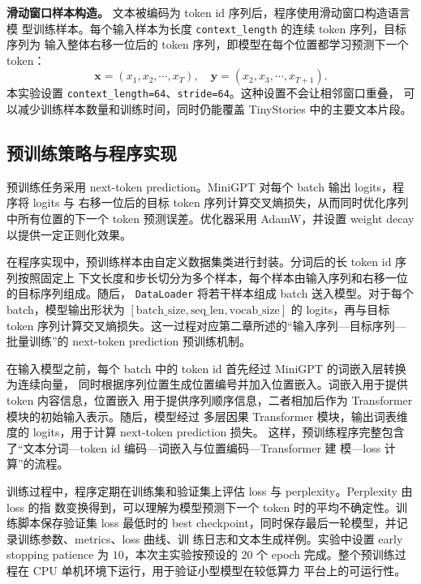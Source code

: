 \documentclass[UTF8,a4paper,zihao=-4,fontset=none]{ctexart}
\numberwithin{equation}{section}
\begin{document}
\textbf{滑动窗口样本构造。} 文本被编码为 token id 序列后，程序使用滑动窗口构造语言模
型训练样本。每个输入样本为长度 \texttt{context\_length} 的连续 token 序列，目标序列为
输入整体右移一位后的 token 序列，即模型在每个位置都学习预测下一个 token：
\begin{equation}
  \mathbf{x}=(x_1,x_2,\cdots,x_T),\quad
  \mathbf{y}=(x_2,x_3,\cdots,x_{T+1}) .
  \label{eq:pretrain_next_token_sample}
\end{equation}
本实验设置 \texttt{context\_length=64}、\texttt{stride=64}。这种设置不会让相邻窗口重叠，
可以减少训练样本数量和训练时间，同时仍能覆盖 TinyStories 中的主要文本片段。

\subsection{预训练策略与程序实现}

预训练任务采用 next-token prediction。MiniGPT 对每个 batch 输出 logits，程序将 logits 与
右移一位后的目标 token 序列计算交叉熵损失，从而同时优化序列中所有位置的下一个 token
预测误差。优化器采用 AdamW，并设置 weight decay 以提供一定正则化效果。

在程序实现中，预训练样本由自定义数据集类进行封装。分词后的长 token id 序列按照固定上
下文长度和步长切分为多个样本，每个样本由输入序列和右移一位的目标序列组成。随后，
\texttt{DataLoader} 将若干样本组成 batch 送入模型。对于每个 batch，模型输出形状为
$[\mathrm{batch\_size},\mathrm{seq\_len},\mathrm{vocab\_size}]$ 的 logits，再与目标 token
序列计算交叉熵损失。这一过程对应第二章所述的“输入序列—目标序列—批量训练”的
next-token prediction 预训练机制。

在输入模型之前，每个 batch 中的 token id 首先经过 MiniGPT 的词嵌入层转换为连续向量，
同时根据序列位置生成位置编号并加入位置嵌入。词嵌入用于提供 token 内容信息，位置嵌入
用于提供序列顺序信息，二者相加后作为 Transformer 模块的初始输入表示。随后，模型经过
多层因果 Transformer 模块，输出词表维度的 logits，用于计算 next-token prediction 损失。
这样，预训练程序完整包含了“文本分词—token id 编码—词嵌入与位置编码—Transformer 建
模—loss 计算”的流程。

训练过程中，程序定期在训练集和验证集上评估 loss 与 perplexity。Perplexity 由 loss 的指
数变换得到，可以理解为模型预测下一个 token 时的平均不确定性。训练脚本保存验证集 loss
最低时的 best checkpoint，同时保存最后一轮模型，并记录训练参数、metrics、loss 曲线、训
练日志和文本生成样例。实验中设置 early stopping patience 为 $10$，本次主实验按预设的
$20$ 个 epoch 完成。整个预训练过程在 CPU 单机环境下运行，用于验证小型模型在较低算力
平台上的可运行性。
\end{document}
